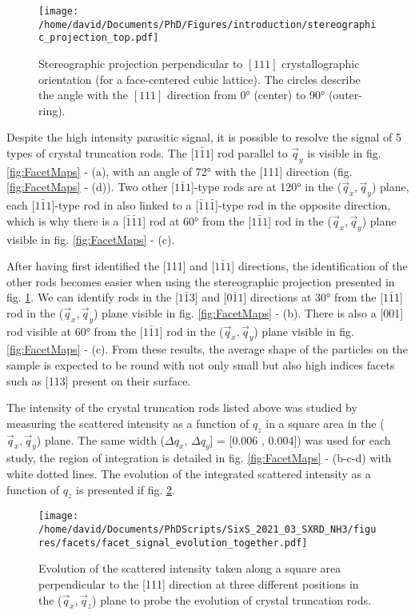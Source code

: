 \begin{figure}[!htb]
    \centering
    \texttt{[image: /home/david/Documents/PhD/Figures/introduction/stereographic\_projection\_top.pdf]}
    \caption{
        Stereographic projection perpendicular to $[111]$ crystallographic orientation (for a face-centered cubic lattice).
        The circles describe the angle with the $[111]$ direction from \ang{0} (center) to \ang{90} (outer-ring).
    }
    \label{fig:StereoTop}
\end{figure}

Despite the high intensity parasitic signal, it is possible to resolve the signal of 5 types of crystal truncation rods.
The [$1\bar{1}1$] rod parallel to $\vec{q}_y$ is visible in fig. \ref{fig:FacetMaps} - (a), with an angle of \ang{72} with the [111] direction (fig. \ref{fig:FacetMaps} - (d)).
Two other [$1\bar{1}1$]-type rods are at \ang{120} in the ($\vec{q}_x, \vec{q}_y$) plane, each [$1\bar{1}1$]-type rod in also linked to a [$\bar{1}1\bar{1}$]-type rod in the opposite direction, which is why there is a [$\bar{1}\bar{1}1$] rod at \ang{60} from the [$1\bar{1}1$] rod in the ($\vec{q}_x, \vec{q}_y$) plane visible in fig. \ref{fig:FacetMaps} - (c).

After having first identified the [111] and [$1\bar{1}1$] directions, the identification of the other rods becomes easier when using the stereographic projection presented in fig. \ref{fig:StereoTop}.
We can identify rods in the [$1\bar{1}3$] and [$0\bar{1}1$] directions at \ang{30} from the [$1\bar{1}1$] rod in the ($\vec{q}_x, \vec{q}_y$) plane visible in fig. \ref{fig:FacetMaps} - (b).
There is also a [001] rod visible at \ang{60} from the [$1\bar{1}1$] rod in the ($\vec{q}_x, \vec{q}_y$) plane visible in fig. \ref{fig:FacetMaps} - (c).
From these results, the average shape of the particles on the sample is expected to be round with not only small but also high indices facets such as [113] present on their surface.

The intensity of the crystal truncation rods listed above was studied by measuring the scattered intensity as a function of $q_z$ in a square area in the ($\vec{q}_x, \vec{q}_y$) plane.
The same width ($\Delta q_x$, $\Delta q_y$] = [0.006 , 0.004]) was used for each study, the region of integration is detailed in fig. \ref{fig:FacetMaps} - (b-c-d) with white dotted lines.
The evolution of the integrated scattered intensity as a function of $q_z$ is presented if fig. \ref{fig:FacetSignal}.

\begin{figure}[!htb]
    \centering
    \texttt{[image: /home/david/Documents/PhDScripts/SixS\_2021\_03\_SXRD\_NH3/figures/facets/facet\_signal\_evolution\_together.pdf]}
    \caption{
    Evolution of the scattered intensity taken along a square area perpendicular to the [111] direction at three different positions in the ($\vec{q}_x, \vec{q}_z$) plane to probe the evolution of crystal truncation rods.
    }
    \label{fig:FacetSignal}
\end{figure}


